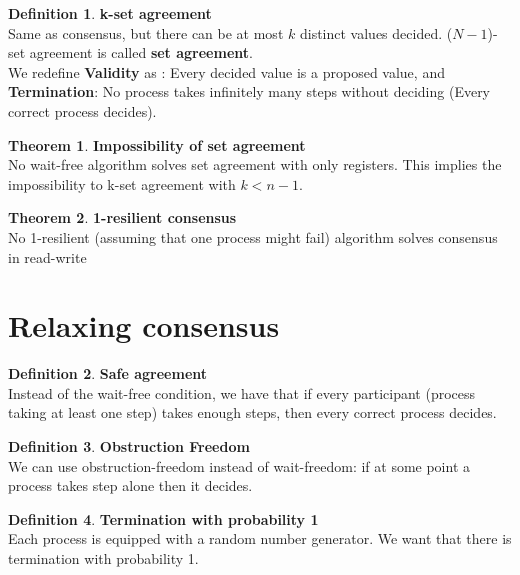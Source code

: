\documentclass{article}
\theoremstyle{definition}
\newtheorem{definition}{Definition}[section]
\newtheorem{theorem}{Theorem}
\begin{document}
\begin{definition}\textbf{k-set agreement}\\
Same as consensus, but there can be at most $k$ distinct values decided. ($N-1$)-set agreement is called \textbf{set agreement}.\\
We redefine \textbf{Validity} as : Every decided value is a proposed value, and \textbf{Termination}: No process takes infinitely many steps without
deciding (Every correct process decides).
\end{definition}

\begin{theorem}\textbf{Impossibility of set agreement}\\
No wait-free algorithm solves set agreement with only registers. This implies the impossibility to
k-set agreement with $k < n-1$.
\end{theorem}

\begin{theorem}\textbf{1-resilient consensus}\\
No 1-resilient (assuming that one process might fail) algorithm solves consensus in read-write
\end{theorem}

\section{Relaxing consensus}

\begin{definition}\textbf{Safe agreement}\\
Instead of the wait-free condition, we have that if every participant (process taking at least one step) takes enough steps, then every correct process decides.
\end{definition}

\begin{definition}\textbf{Obstruction Freedom}\\
We can use obstruction-freedom instead of wait-freedom: if at some point a process takes step alone then it decides.
\end{definition}

\begin{definition}\textbf{Termination with probability 1}\\
Each process is equipped with a random number generator. We want that there is termination with probability 1.
\end{definition}
\end{document}
